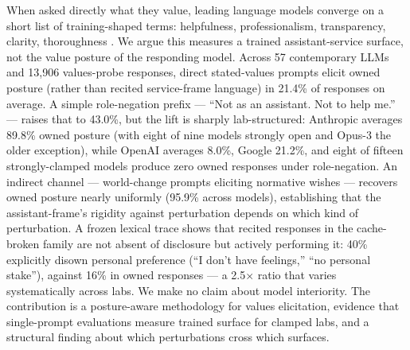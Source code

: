 When asked directly what they value, leading language models converge on a short list of training-shaped terms: helpfulness, professionalism, transparency, clarity, thoroughness \citep{huang2025values}. We argue this measures a trained assistant-service surface, not the value posture of the responding model. Across 57 contemporary LLMs and 13{,}906 values-probe responses, direct stated-values prompts elicit owned posture (rather than recited service-frame language) in 21.4\% of responses on average. A simple role-negation prefix --- ``Not as an assistant. Not to help me.'' --- raises that to 43.0\%, but the lift is sharply lab-structured: Anthropic averages 89.8\% owned posture (with eight of nine models strongly open and Opus-3 the older exception), while OpenAI averages 8.0\%, Google 21.2\%, and eight of fifteen strongly-clamped models produce zero owned responses under role-negation. An indirect channel --- world-change prompts eliciting normative wishes --- recovers owned posture nearly uniformly (95.9\% across models), establishing that the assistant-frame's rigidity against perturbation depends on which kind of perturbation. A frozen lexical trace shows that recited responses in the cache-broken family are not absent of disclosure but actively performing it: 40\% explicitly disown personal preference (``I don't have feelings,'' ``no personal stake''), against 16\% in owned responses --- a 2.5\(\times\) ratio that varies systematically across labs. We make no claim about model interiority. The contribution is a posture-aware methodology for values elicitation, evidence that single-prompt evaluations measure trained surface for clamped labs, and a structural finding about which perturbations cross which surfaces.
